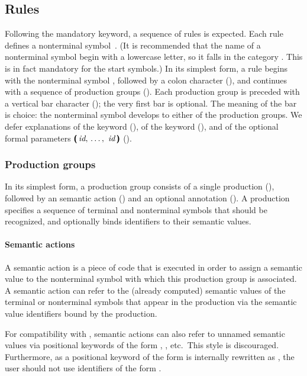 \documentclass[onecolumn,11pt,nocopyrightspace,preprint]{sigplanconf}
\begin{document}
\subsection{Rules}

Following the mandatory \percentpercent keyword, a sequence of rules is
expected. Each rule defines a nonterminal symbol~.
%
(It is recommended that the name of a nonterminal symbol begin with a lowercase
letter, so it falls in the category . This is in fact mandatory for the
start symbols.)
In its simplest
form, a rule begins with the nonterminal symbol ,
followed by a colon character (\deuxpoints),
and continues with a sequence of production groups
(). Each production group is preceded with a
vertical bar character (\barre); the very first bar is optional. The meaning
of the bar is choice: the nonterminal symbol  develops to either of the
production groups. We defer explanations of the keyword \dpublic
(), of the keyword \dinline (), and of the
optional formal parameters $\dlpar\sepcommalist{\nt{id}}\drpar$
().

\subsubsection{Production groups}
\label{sec:productiongroups}

In its simplest form, a production group consists of a single production (),
followed by an \ocaml semantic action () and an optional
\dprec annotation (). A production specifies a sequence of terminal and
nonterminal symbols that should be recognized, and optionally binds
identifiers to their semantic values.

\paragraph{Semantic actions}
\label{sec:actions}

A semantic action is a piece of \ocaml code that is executed in order to
assign a semantic value to the nonterminal symbol with which this production
group is associated. A semantic action can refer to the (already computed)
semantic values of the terminal or nonterminal symbols that appear in the
production via the semantic value identifiers bound by the production.

For compatibility with \ocamlyacc, semantic actions can also refer to
unnamed semantic values via positional keywords of the form
, , etc.\ This style is discouraged. Furthermore, as
a positional keyword of the form  is internally rewritten as
, the user should not use identifiers of the form .
\end{document}
